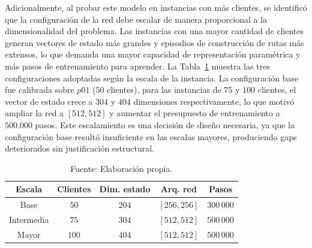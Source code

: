Adicionalmente, al probar este modelo en instancias con más clientes, se identificó que la configuración de la red debe escalar de manera proporcional a la dimensionalidad del problema. Las instancias con una mayor cantidad de clientes generan vectores de estado más grandes y episodios de construcción de rutas más extensos, lo que demanda una mayor capacidad de representación paramétrica y más pasos de entrenamiento para aprender. La Tabla~\ref{table:Config} muestra las tres configuraciones adoptadas según la escala de la instancia. La configuración base fue calibrada sobre $p01$ ($50$ clientes), para las instancias de $75$ y $100$ clientes, el vector de estado crece a $304$ y $404$ dimensiones respectivamente, lo que motivó ampliar la red a $[512, 512]$ y aumentar el presupuesto de entrenamiento a $500.000$ pasos. Este escalamiento es una decisión de diseño necesaria, ya que la configuración base resultó insuficiente en las escalas mayores, produciendo gaps deteriorados sin justificación estructural. 



\begin{table}[H]
    \centering
    \caption{\label{table:Config} Configuración experimental según escala de instancia.}
    \caption*{Fuente: Elaboración propia.}
    \normalsize
    \setlength{\tabcolsep}{10pt}
    \renewcommand{\arraystretch}{1.12}
    \begin{tabular}{@{}ccccc@{}}
        \toprule
        \textbf{Escala} & \textbf{Clientes} & \textbf{Dim. estado} & \textbf{Arq. red} & \textbf{Pasos} \\
        \midrule
        Base        & $50$  & $204$ & $[256, 256]$ & $300\,000$ \\
        Intermedia  & $75$  & $304$ & $[512, 512]$ & $500\,000$ \\
        Mayor       & $100$ & $404$ & $[512, 512]$ & $500\,000$ \\
        \bottomrule
    \end{tabular}
\end{table}

